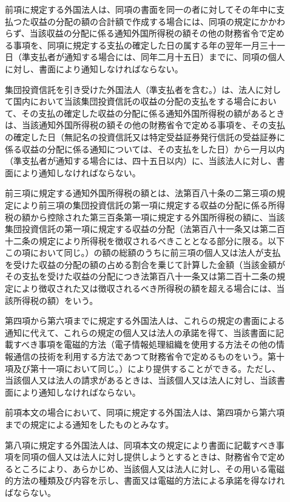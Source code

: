 \documentclass[twocolumn,a4j,10pt]{ltjtarticle}
\begin{document}
\begin{description}
\item[]前項に規定する外国法人は、同項の書面を同一の者に対してその年中に支払つた収益の分配の額の合計額で作成する場合には、同項の規定にかかわらず、当該収益の分配に係る通知外国所得税の額その他の財務省令で定める事項を、同項に規定する支払の確定した日の属する年の翌年一月三十一日（準支払者が通知する場合には、同年二月十五日）までに、同項の個人に対し、書面により通知しなければならない。
\item[]集団投資信託を引き受けた外国法人（準支払者を含む。）は、法人に対して国内において当該集団投資信託の収益の分配の支払をする場合において、その支払の確定した収益の分配に係る通知外国所得税の額があるときは、当該通知外国所得税の額その他の財務省令で定める事項を、その支払の確定した日（無記名の投資信託又は特定受益証券発行信託の受益証券に係る収益の分配に係る通知については、その支払をした日）から一月以内（準支払者が通知する場合には、四十五日以内）に、当該法人に対し、書面により通知しなければならない。
\item[]前三項に規定する通知外国所得税の額とは、法第百八十条の二第三項の規定により前三項の集団投資信託の第一項に規定する収益の分配に係る所得税の額から控除された第三百条第一項に規定する外国所得税の額に、当該集団投資信託の第一項に規定する収益の分配（法第百八十一条又は第二百十二条の規定により所得税を徴収されるべきこととなる部分に限る。以下この項において同じ。）の額の総額のうちに前三項の個人又は法人が支払を受けた収益の分配の額の占める割合を乗じて計算した金額（当該金額がその支払を受けた収益の分配につき法第百八十一条又は第二百十二条の規定により徴収された又は徴収されるべき所得税の額を超える場合には、当該所得税の額）をいう。
\item[]第四項から第六項までに規定する外国法人は、これらの規定の書面による通知に代えて、これらの規定の個人又は法人の承諾を得て、当該書面に記載すべき事項を電磁的方法（電子情報処理組織を使用する方法その他の情報通信の技術を利用する方法であつて財務省令で定めるものをいう。第十項及び第十一項において同じ。）により提供することができる。ただし、当該個人又は法人の請求があるときは、当該個人又は法人に対し、当該書面により通知しなければならない。
\item[]前項本文の場合において、同項に規定する外国法人は、第四項から第六項までの規定による通知をしたものとみなす。
\item[]第八項に規定する外国法人は、同項本文の規定により書面に記載すべき事項を同項の個人又は法人に対し提供しようとするときは、財務省令で定めるところにより、あらかじめ、当該個人又は法人に対し、その用いる電磁的方法の種類及び内容を示し、書面又は電磁的方法による承諾を得なければならない。

\end{description}
\end{document}
